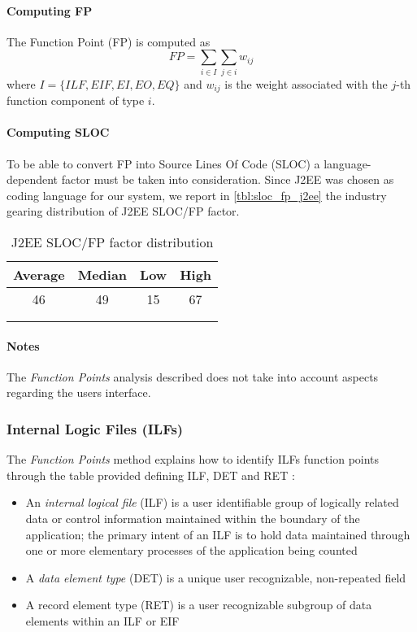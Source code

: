 \paragraph{Computing FP}The Function Point (FP) is computed as
$$ FP = \sum_{i \in I} \sum_{j \in i} w_{ij}$$
where $ I = \{ILF,EIF,EI,EO,EQ\}$ and $w_{ij}$ is the weight associated with the $j$-th function component of type $i$.


\paragraph{Computing SLOC}To be able to convert FP into Source Lines Of Code (SLOC) a language-dependent factor must be taken into consideration. Since J2EE was chosen as coding language for our system, we report in \autoref{tbl:sloc_fp_j2ee} the industry gearing distribution of J2EE SLOC/FP factor. \cite{QSM}

\begin{longtable}{cccc}
\toprule
\textbf{Average} & \textbf{Median} & \textbf{Low} & \textbf{High}\\
\midrule
46 & 49 & 15 & 67\\
\bottomrule \\
\caption{J2EE SLOC/FP factor distribution}
\label{tbl:sloc_fp_j2ee}
\end{longtable}

\paragraph{Notes} The \emph{Function Points} analysis described does not take into account aspects regarding the users interface.
\clearpage

\subsubsection{Internal Logic Files (ILFs)}
\label{sec:ILFs}

The \emph{Function Points} method explains how to identify ILFs function points through the table provided defining ILF, DET and RET \cite{FP}:
\begin{itemize}
	\item An \emph{internal logical file} (ILF) is a user identifiable group of logically related data or control information maintained within the boundary of the application; the primary intent of an ILF is to hold data maintained through one or more elementary processes of the application being counted 
	\item A \emph{data element type} (DET) is a unique user recognizable, non-repeated field
	\item A {record element type} (RET) is a user recognizable subgroup of data elements within an ILF or EIF
\end{itemize}

